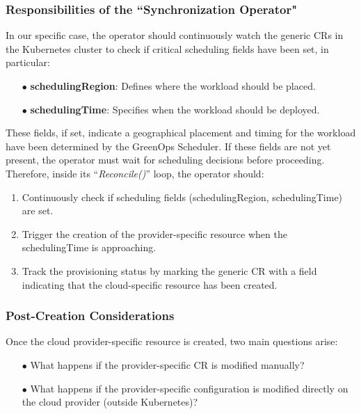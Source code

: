 \subsubsection{Responsibilities of the ``Synchronization Operator"}

In our specific case, the operator should continuously watch the generic CRs in the Kubernetes cluster to check if critical scheduling fields have been set, in particular:
\begin{itemize}[itemsep=0.2pt, topsep=1pt]
  \item[$\bullet$] \textbf{schedulingRegion}: Defines where the workload should be placed.
  \item[$\bullet$] \textbf{schedulingTime}: Specifies when the workload should be deployed.
\end{itemize}

These fields, if set, indicate a geographical placement and timing for the workload have been determined by the GreenOps Scheduler.
If these fields are not yet present, the operator must wait for scheduling decisions before proceeding.
Therefore, inside its ``\textit{Reconcile()}'' loop, the operator should:
\begin{enumerate}[itemsep=0.2pt, topsep=1pt]
  \item Continuously check if scheduling fields (schedulingRegion, schedulingTime) are set.
  \item Trigger the creation of the provider-specific resource when the schedulingTime is approaching.
  \item Track the provisioning status by marking the generic CR with a field indicating that the cloud-specific resource has been created.
\end{enumerate}

\subsubsection{Post-Creation Considerations}

Once the cloud provider-specific resource is created, two main questions arise:
\begin{itemize}[itemsep=0.2pt, topsep=1pt]
  \item[$\bullet$] What happens if the provider-specific CR is modified manually?
  \item[$\bullet$] What happens if the provider-specific configuration is modified directly on the cloud provider (outside Kubernetes)?
\end{itemize}


